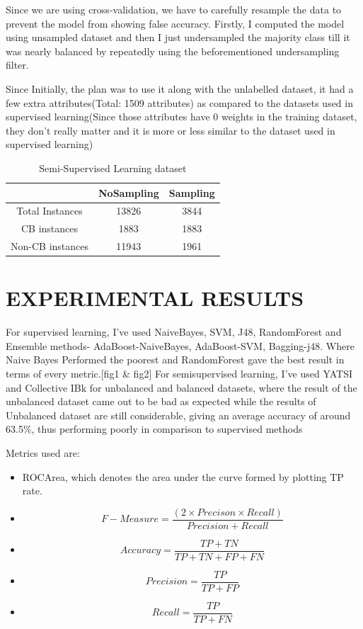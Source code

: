 \documentclass[10pt,conference]{IEEEtran}
\begin{document}
Since we are using cross-validation, we have to carefully resample the data to prevent the model from showing false accuracy. Firstly, I computed the model using unsampled dataset and then I just undersampled the majority class till it was nearly balanced by repeatedly using the beforementioned undersampling filter.

Since Initially, the plan was to use it along with the unlabelled dataset, it had a few extra attributes(Total: 1509 attributes) as compared to the datasets used in supervised learning(Since those attributes have 0 weights in the training dataset, they don’t really matter and it is more or less similar to the dataset used in supervised learning)
\begin{table}[htbp]
    \caption{Semi-Supervised Learning dataset}
    \centering
    \begin{tabular}{|c|c|c|}
    \hline
         & NoSampling & Sampling \\
    \hline
    Total Instances & 13826 & 3844 \\
    \hline
    CB instances & 1883 & 1883 \\
    \hline
    Non-CB instances & 11943 & 1961 \\
    \hline

    \end{tabular}
    
    \label{tab:my_label}
\end{table}


\section{EXPERIMENTAL RESULTS}
For supervised learning, I’ve used NaiveBayes, SVM, J48, RandomForest and Ensemble methods- AdaBoost-NaiveBayes, AdaBoost-SVM, Bagging-j48. Where Naive Bayes Performed the poorest and RandomForest gave the best result in terms of every metric.[fig1 \& fig2]
For semisupervised learning, I’ve used YATSI and Collective IBk for unbalanced and balanced datasets, where the result of the unbalanced dataset came out to be bad as expected while the results of Unbalanced dataset are still considerable, giving an average accuracy of around 63.5\%, thus performing poorly in comparison to supervised methods

Metrics used are:
\begin{itemize}
    \item ROCArea, which denotes the area under the curve formed by plotting TP rate.
    \item\[F-Measure = \frac{(2 \times Precison \times Recall)}{Precision + Recall}\]

    \item \[Accuracy = \frac{TP+TN}{TP+TN+FP+FN}\]
    \item \[Precision = \frac{TP}{TP+FP}\]
    \item \[Recall = \frac{TP}{TP+FN}\]
\end{itemize}
\end{document}
